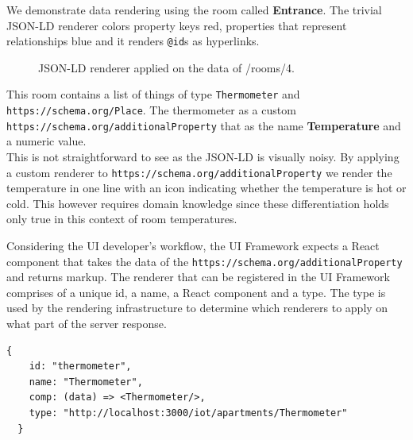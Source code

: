 We demonstrate data rendering using the room called \textbf{Entrance}. The trivial JSON-LD renderer colors property keys red, properties that represent relationships blue and it renders \lstinline{@id}s as hyperlinks.

\begin{figure}[!htb]
  \caption{JSON-LD renderer applied on the data of /rooms/4.}
\end{figure}

This room contains a list of things of type \lstinline{Thermometer} and \lstinline{https://schema.org/Place}. The thermometer as a custom \lstinline{https://schema.org/additionalProperty} that as the name \textbf{Temperature} and a numeric value. \\ This is not straightforward to see as the JSON-LD is visually noisy. By applying a custom renderer to \lstinline{https://schema.org/additionalProperty} we render the temperature in one line with an icon indicating whether the temperature is hot or cold. This however requires domain knowledge since these differentiation holds only true in this context of room temperatures.

Considering the UI developer's workflow, the UI Framework expects a React component that takes the data of the \lstinline{https://schema.org/additionalProperty} and returns markup. The renderer that can be registered in the UI Framework comprises of a unique id, a name, a React component and a type. The type is used by the rendering infrastructure to determine which renderers to apply on what part of the server response.

\lstset{language=JSON}
\begin{lstlisting}[caption=Renderer configuration that the developer provides.]
  {
    id: "thermometer",
    name: "Thermometer",
    comp: (data) => <Thermometer/>,
    type: "http://localhost:3000/iot/apartments/Thermometer"
  }
\end{lstlisting}

